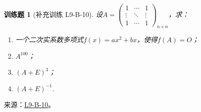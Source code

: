 \documentclass[UTF8,12pt,a4paper,fontset=fandol]{ctexart}
\newtheorem{exercise}{训练题}[section]
\begin{document}
\begin{exercise}[补充训练 L9-B-10]\label{prob:L9-B-10}
设$A=\begin{pmatrix}
                1      & \cdots & 1      \\
                \vdots & \ddots & \vdots \\
                1      & \cdots & 1
            \end{pmatrix}_{n \times n}$，求：
        \begin{enumerate}
            \item 一个二次实系数多项式$f(x)=ax^2+bx$，使得$f(A)=O$；
            \item $A^{100}$；
            \item $(A+E)^3$；
            \item $(A+E)^{-1}$.
        \end{enumerate}
\end{exercise}
\noindent 来源：\href{https://github.com/yhwu-is/Linear-Algebra-Left-Undone/blob/new/%E8%AE%B2%E4%B9%89/%E4%B8%93%E9%A2%98/9%20%E7%9F%A9%E9%98%B5%E8%BF%90%E7%AE%97%E8%BF%9B%E9%98%B6.tex}{L9-B-10}。
\end{document}
